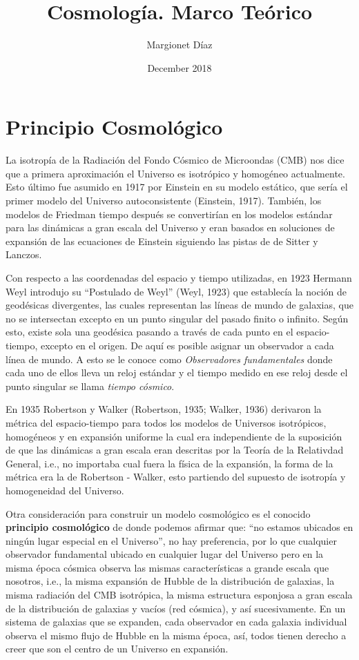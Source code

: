 \documentclass{article}
\title{Cosmología. Marco Teórico}
\author{Margionet Díaz}
\date{December 2018}
\begin{document}
\maketitle

\section{Principio Cosmológico}

La isotropía de la Radiación del Fondo Cósmico de Microondas (CMB) nos dice que a primera aproximación el Universo es isotrópico y homogéneo actualmente. Esto último fue asumido en 1917 por Einstein en su modelo estático, que sería el primer modelo del Universo autoconsistente (Einstein, 1917). También, los modelos de Friedman tiempo después se convertirían en los modelos estándar para las dinámicas a gran escala del Universo y eran basados en soluciones de expansión de las ecuaciones de Einstein siguiendo las pistas de de Sitter y Lanczos.



Con respecto a las coordenadas del espacio y tiempo utilizadas, en 1923 Hermann Weyl introdujo su ``Postulado de Weyl'' (Weyl, 1923) que establecía la noción de geodésicas divergentes, las cuales representan las líneas de mundo de galaxias, que no se intersectan excepto en un punto singular del pasado finito o infinito. Según esto, existe sola una geodésica pasando a través de cada punto en el espacio-tiempo, excepto en el origen.  De aquí es posible asignar un observador a cada línea de mundo. A esto se le conoce como {\textit{Observadores fundamentales}} donde cada uno de ellos lleva un reloj estándar y el tiempo medido en ese reloj desde el punto singular se llama {\textit{tiempo cósmico}}.

En 1935 Robertson y Walker (Robertson, 1935; Walker, 1936) derivaron la métrica del espacio-tiempo para todos los modelos de Universos isotrópicos, homogéneos y en expansión uniforme la cual era independiente de la suposición de que las dinámicas a gran escala eran descritas por la Teoría de la Relativdad General, i.e., no importaba cual fuera la física de la expansión,  la forma de la métrica era la de Robertson - Walker, esto partiendo del supuesto de isotropía y homogeneidad del Universo. 

Otra consideración para construir un modelo cosmológico es el conocido {\bf{principio cosmológico}} de donde podemos afirmar que: ``no estamos ubicados en ningún lugar especial en el Universo'', no hay preferencia, por lo que cualquier observador fundamental ubicado en cualquier lugar del Universo pero en la misma época cósmica observa las mismas características a grande escala que nosotros, i.e., la misma expansión de Hubble de la distribución de galaxias, la misma radiación del CMB isotrópica, la misma estructura esponjosa a gran escala de la distribución de galaxias y vacíos (red cósmica), y así sucesivamente. 
En un sistema de galaxias que se expanden, cada observador en cada galaxia individual observa el mismo flujo de Hubble en la misma época, así, todos tienen derecho a creer que son el centro de un Universo en expansión. 
\end{document}

